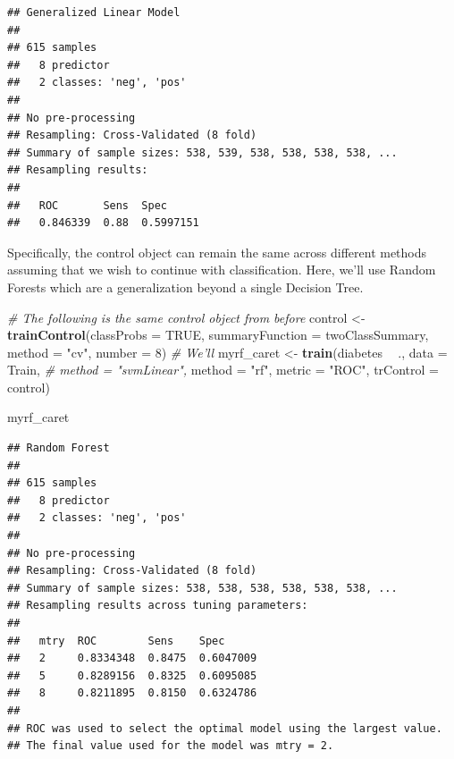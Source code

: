 \documentclass[]{book}
\newenvironment{Shaded}{\begin{snugshade}}{\end{snugshade}}
\newcommand{\KeywordTok}[1]{\textcolor[rgb]{0.13,0.29,0.53}{\textbf{#1}}}
\newcommand{\DataTypeTok}[1]{\textcolor[rgb]{0.13,0.29,0.53}{#1}}
\newcommand{\DecValTok}[1]{\textcolor[rgb]{0.00,0.00,0.81}{#1}}
\newcommand{\StringTok}[1]{\textcolor[rgb]{0.31,0.60,0.02}{#1}}
\newcommand{\CommentTok}[1]{\textcolor[rgb]{0.56,0.35,0.01}{\textit{#1}}}
\newcommand{\OtherTok}[1]{\textcolor[rgb]{0.56,0.35,0.01}{#1}}
\newcommand{\OperatorTok}[1]{\textcolor[rgb]{0.81,0.36,0.00}{\textbf{#1}}}
\newcommand{\NormalTok}[1]{#1}
\begin{document}
\begin{verbatim}
## Generalized Linear Model 
## 
## 615 samples
##   8 predictor
##   2 classes: 'neg', 'pos' 
## 
## No pre-processing
## Resampling: Cross-Validated (8 fold) 
## Summary of sample sizes: 538, 539, 538, 538, 538, 538, ... 
## Resampling results:
## 
##   ROC       Sens  Spec     
##   0.846339  0.88  0.5997151
\end{verbatim}

Specifically, the control object can remain the same across different
methods assuming that we wish to continue with classification. Here,
we'll use Random Forests which are a generalization beyond a single
Decision Tree.

\begin{Shaded}
\begin{Highlighting}[]
\CommentTok{# The following is the same control object from before}
\NormalTok{control <-}\StringTok{ }\KeywordTok{trainControl}\NormalTok{(}\DataTypeTok{classProbs =} \OtherTok{TRUE}\NormalTok{,}
                        \DataTypeTok{summaryFunction =}\NormalTok{ twoClassSummary,}
                        \DataTypeTok{method =} \StringTok{"cv"}\NormalTok{,}
                        \DataTypeTok{number =} \DecValTok{8}\NormalTok{)}
\CommentTok{# We'll }
\NormalTok{myrf_caret <-}\StringTok{ }\KeywordTok{train}\NormalTok{(diabetes }\OperatorTok{~}\StringTok{ }\NormalTok{.,}
               \DataTypeTok{data =}\NormalTok{ Train,}
 \CommentTok{#              method = "svmLinear",}
               \DataTypeTok{method =} \StringTok{"rf"}\NormalTok{,}
               \DataTypeTok{metric =} \StringTok{"ROC"}\NormalTok{,}
               \DataTypeTok{trControl =}\NormalTok{ control)}

\NormalTok{myrf_caret}
\end{Highlighting}
\end{Shaded}

\begin{verbatim}
## Random Forest 
## 
## 615 samples
##   8 predictor
##   2 classes: 'neg', 'pos' 
## 
## No pre-processing
## Resampling: Cross-Validated (8 fold) 
## Summary of sample sizes: 538, 538, 538, 538, 538, 538, ... 
## Resampling results across tuning parameters:
## 
##   mtry  ROC        Sens    Spec     
##   2     0.8334348  0.8475  0.6047009
##   5     0.8289156  0.8325  0.6095085
##   8     0.8211895  0.8150  0.6324786
## 
## ROC was used to select the optimal model using the largest value.
## The final value used for the model was mtry = 2.
\end{verbatim}
\end{document}
